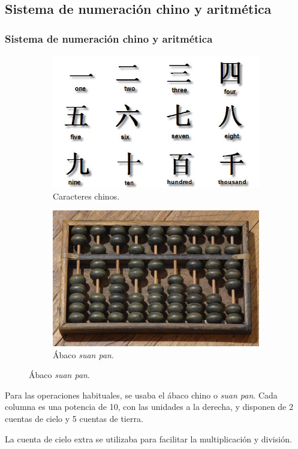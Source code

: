 \documentclass[compress, aspectratio=169]{beamer} %
\begin{document}
	\subsection{Sistema de numeración chino y aritmética}
		\begin{frame}
			\frametitle{Sistema de numeración chino y aritmética}
			
			
			\begin{figure}
			\centering
				\begin{subfigure}{.5\textwidth}
					\centering
					\includegraphics[width = .5\linewidth]{chinese_numbers.jpg}
					\caption{Caracteres chinos.}
				\end{subfigure}%
				\pause
				\begin{subfigure}{.5\textwidth}
					\centering
					\includegraphics[width = .5\linewidth]{Chinese-abacus.jpg}
					\caption{Ábaco \textit{suan pan}.}
				\end{subfigure}
			\end{figure}
			
			Para las operaciones habituales, se usaba el ábaco chino o \textit{suan pan}. Cada columna es una
			potencia de 10, con las unidades a la derecha, y disponen de 2 cuentas de cielo y 5 cuentas de tierra.
			
			\pause
			
			\alert{La cuenta de cielo extra se utilizaba para facilitar la multiplicación y división.}
			
		\end{frame}
\end{document}

